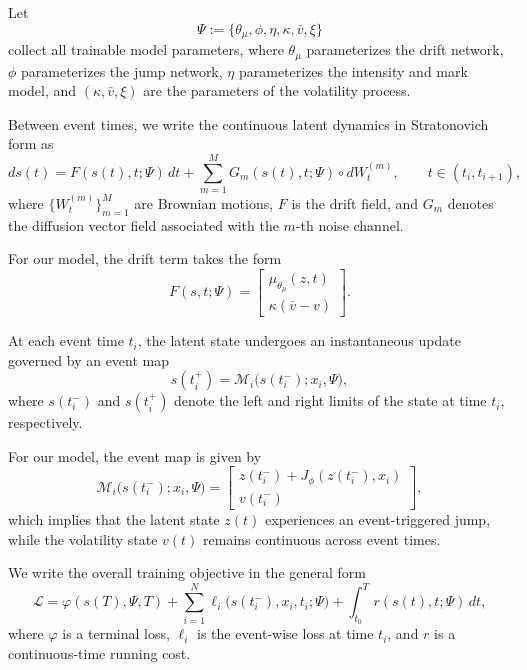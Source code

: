 \documentclass[11pt]{article}
\theoremstyle{definition}
\numberwithin{equation}{section}
\numberwithin{theorem}{section}
\numberwithin{proposition}{section}
\numberwithin{lemma}{section}
\numberwithin{corollary}{section}
\numberwithin{definition}{section}
\numberwithin{remark}{section}
\newcommand{\1}{\mathbbm{1}}
\begin{document}
Let
\begin{equation}
\Psi := \{\theta_\mu,\phi,\eta,\kappa,\bar v,\xi\}
\end{equation}
collect all trainable model parameters, where $\theta_\mu$ parameterizes the drift network, $\phi$ parameterizes the jump network, $\eta$ parameterizes the intensity and mark model, and $(\kappa,\bar v,\xi)$ are the parameters of the volatility process.

Between event times, we write the continuous latent dynamics in Stratonovich form as
\begin{equation}
\label{eq:general_stratonovich_dynamics}
ds(t)
=
F(s(t),t;\Psi)\,dt
+
\sum_{m=1}^{M} G_m(s(t),t;\Psi)\circ dW_t^{(m)},
\qquad t\in (t_i,t_{i+1}),
\end{equation}
where $\{W_t^{(m)}\}_{m=1}^M$ are Brownian motions, $F$ is the drift field, and $G_m$ denotes the diffusion vector field associated with the $m$-th noise channel.

For our model, the drift term takes the form
\begin{equation}
\label{eq:drift_specific}
F(s,t;\Psi)
=
\begin{bmatrix}
\mu_{\theta_\mu}(z,t)\\
\kappa(\bar v-v)
\end{bmatrix}.
\end{equation}

At each event time $t_i$, the latent state undergoes an instantaneous update governed by an event map
\begin{equation}
\label{eq:event_map_general}
s(t_i^+)
=
\mathcal{M}_i\bigl(s(t_i^-);x_i,\Psi\bigr),
\end{equation}
where $s(t_i^-)$ and $s(t_i^+)$ denote the left and right limits of the state at time $t_i$, respectively.

For our model, the event map is given by
\begin{equation}
\label{eq:event_map_specific}
\mathcal{M}_i\bigl(s(t_i^-);x_i,\Psi\bigr)
=
\begin{bmatrix}
z(t_i^-)+J_{\phi}(z(t_i^-),x_i)\\
v(t_i^-)
\end{bmatrix},
\end{equation}
which implies that the latent state $z(t)$ experiences an event-triggered jump, while the volatility state $v(t)$ remains continuous across event times.

We write the overall training objective in the general form
\begin{equation}
\label{eq:general_loss}
\mathcal{L}
=
\varphi(s(T),\Psi,T)
+
\sum_{i=1}^{N}\ell_i\bigl(s(t_i^-),x_i,t_i;\Psi\bigr)
+
\int_{t_0}^{T} r(s(t),t;\Psi)\,dt,
\end{equation}
where $\varphi$ is a terminal loss, $\ell_i$ is the event-wise loss at time $t_i$, and $r$ is a continuous-time running cost.
\end{document}
